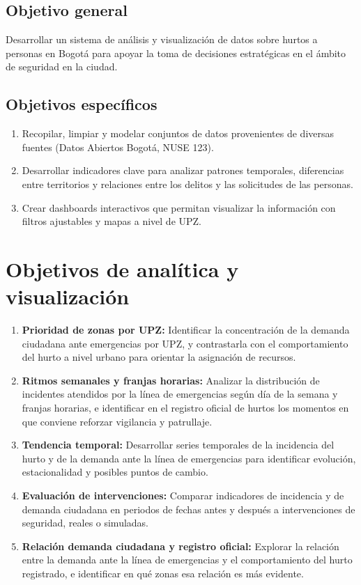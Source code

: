 \documentclass[12pt,letterpaper]{article}
\begin{document}
\subsection{Objetivo general}

Desarrollar un sistema de análisis y visualización de datos sobre hurtos a personas en Bogotá para apoyar la toma de decisiones estratégicas en el ámbito de seguridad en la ciudad.

\subsection{Objetivos específicos}

\begin{enumerate}
    \item Recopilar, limpiar y modelar conjuntos de datos provenientes de diversas fuentes (Datos Abiertos Bogotá, NUSE 123).
    \item Desarrollar indicadores clave para analizar patrones temporales, diferencias entre territorios y relaciones entre los delitos y las solicitudes de las personas.
    \item Crear dashboards interactivos que permitan visualizar la información con filtros ajustables y mapas a nivel de UPZ.
\end{enumerate}

\section{Objetivos de analítica y visualización}

\begin{enumerate}
    \item \textbf{Prioridad de zonas por UPZ:} Identificar la concentración de la demanda ciudadana ante emergencias por UPZ, y contrastarla con el comportamiento del hurto a nivel urbano para orientar la asignación de recursos.
    \item \textbf{Ritmos semanales y franjas horarias:} Analizar la distribución de incidentes atendidos por la línea de emergencias según día de la semana y franjas horarias, e identificar en el registro oficial de hurtos los momentos en que conviene reforzar vigilancia y patrullaje. 
    \item \textbf{Tendencia temporal:} Desarrollar series temporales de la incidencia del hurto y de la demanda ante la línea de emergencias para identificar evolución, estacionalidad y posibles puntos de cambio. 
    \item \textbf{Evaluación de intervenciones:} Comparar indicadores de incidencia y de demanda ciudadana en periodos de fechas antes y después a intervenciones de seguridad, reales o simuladas. 
    \item \textbf{Relación demanda ciudadana y registro oficial:} Explorar la relación entre la demanda ante la línea de emergencias y el comportamiento del hurto registrado, e identificar en qué zonas esa relación es más evidente.
\end{enumerate}
\end{document}
